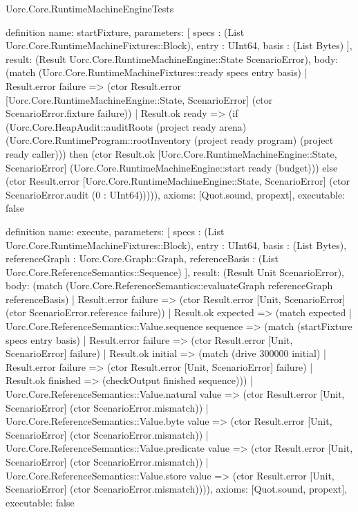 \begin{lexlean}{Uorc.Core.RuntimeMachineEngineTests}
\begin{semanticmodule}
definition{
  name: startFixture,
  parameters: [
    specs : (List Uorc.Core.RuntimeMachineFixtures::Block),
    entry : UInt64,
    basis : (List Bytes)
  ],
  result: (Result Uorc.Core.RuntimeMachineEngine::State ScenarioError),
  body: (match (Uorc.Core.RuntimeMachineFixtures::ready specs entry basis)
    | Result.error failure => (ctor Result.error [Uorc.Core.RuntimeMachineEngine::State, ScenarioError] (ctor ScenarioError.fixture failure))
    | Result.ok ready => (if (Uorc.Core.HeapAudit::auditRoots (project ready arena) (Uorc.Core.RuntimeProgram::rootInventory (project ready program) (project ready caller))) then (ctor Result.ok [Uorc.Core.RuntimeMachineEngine::State, ScenarioError] (Uorc.Core.RuntimeMachineEngine::start ready (budget))) else (ctor Result.error [Uorc.Core.RuntimeMachineEngine::State, ScenarioError] (ctor ScenarioError.audit (0 : UInt64))))),
  axioms: [Quot.sound, propext],
  executable: false
}

definition{
  name: execute,
  parameters: [
    specs : (List Uorc.Core.RuntimeMachineFixtures::Block),
    entry : UInt64,
    basis : (List Bytes),
    referenceGraph : Uorc.Core.Graph::Graph,
    referenceBasis : (List Uorc.Core.ReferenceSemantics::Sequence)
  ],
  result: (Result Unit ScenarioError),
  body: (match (Uorc.Core.ReferenceSemantics::evaluateGraph referenceGraph referenceBasis)
    | Result.error failure => (ctor Result.error [Unit, ScenarioError] (ctor ScenarioError.reference failure))
    | Result.ok expected => (match expected
      | Uorc.Core.ReferenceSemantics::Value.sequence sequence => (match (startFixture specs entry basis)
        | Result.error failure => (ctor Result.error [Unit, ScenarioError] failure)
        | Result.ok initial => (match (drive 300000 initial)
          | Result.error failure => (ctor Result.error [Unit, ScenarioError] failure)
          | Result.ok finished => (checkOutput finished sequence)))
      | Uorc.Core.ReferenceSemantics::Value.natural value => (ctor Result.error [Unit, ScenarioError] (ctor ScenarioError.mismatch))
      | Uorc.Core.ReferenceSemantics::Value.byte value => (ctor Result.error [Unit, ScenarioError] (ctor ScenarioError.mismatch))
      | Uorc.Core.ReferenceSemantics::Value.predicate value => (ctor Result.error [Unit, ScenarioError] (ctor ScenarioError.mismatch))
      | Uorc.Core.ReferenceSemantics::Value.store value => (ctor Result.error [Unit, ScenarioError] (ctor ScenarioError.mismatch)))),
  axioms: [Quot.sound, propext],
  executable: false
}


\end{semanticmodule}
\end{lexlean}
